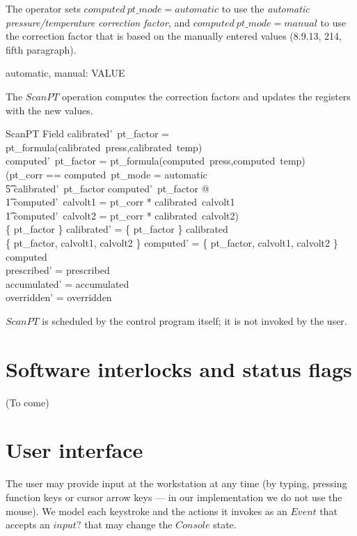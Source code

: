 \documentclass{article}
\begin{document}
The operator sets $computed~pt\_mode = automatic$ to use the 
{\em automatic pressure/temperature correction factor}, 
and $computed~pt\_mode = manual$ to
use the correction factor that is based on the manually entered values (8.9.13,
214, fifth paragraph).

\begin{axdef}
	automatic, manual: VALUE 
\end{axdef}
The $ScanPT$ operation computes the correction factors and updates
the registers with the new values.

\begin{schema}{ScanPT}
	\Delta Field
\where
	calibrated'~pt\_factor = pt\_formula(calibrated~press,calibrated~temp)\\
	computed'~pt\_factor = pt\_formula(computed~press,computed~temp) \\
\also
	(\LET pt\_corr == \IF computed~pt\_mode = automatic \\  
\t5		\THEN calibrated'~pt\_factor \ELSE computed'~pt\_factor @ \\
\t1		computed'~calvolt1 = pt\_corr * calibrated~calvolt1 \land \\
\t1		computed'~calvolt2 = pt\_corr * calibrated~calvolt2) \\
\also
	\{ pt\_factor \} \ndres calibrated' = \{ pt\_factor \} \ndres calibrated \\
	\{ pt\_factor, calvolt1, calvolt2 \} \ndres computed' = \{ pt\_factor, calvolt1, calvolt2 \} \ndres computed \\
\also
	prescribed' = prescribed \\
	accumulated' = accumulated \\
	overridden' = overridden
\end{schema}
$ScanPT$ is scheduled by the control program itself; it is not invoked
by the user.

\section{Software interlocks and status flags} \label{sect:intlk}

(To come)

\newpage

\section{User interface} \label{sect:ui}

The user may provide input at the workstation at any time (by typing,
pressing function keys or cursor arrow keys --- in our implementation
we do not use the mouse).  We model each keystroke and the actions
it invokes as an $Event$ that accepts an $input?$ that may change the
$Console$ state.
\end{document}
